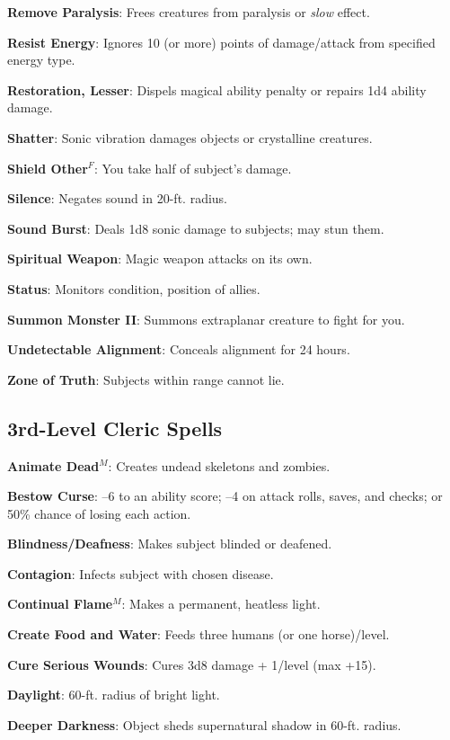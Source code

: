 \textbf{Remove Paralysis}: Frees creatures from paralysis or \textit{slow} effect.

\textbf{Resist Energy}: Ignores 10 (or more) points of damage/attack from specified energy type.

\textbf{Restoration, Lesser}: Dispels magical ability penalty or repairs 1d4 ability damage.

\textbf{Shatter}: Sonic vibration damages objects or crystalline creatures.

\textbf{Shield Other}\(^{F}\): You take half of subject's damage.

\textbf{Silence}: Negates sound in 20-ft. radius.

\textbf{Sound Burst}: Deals 1d8 sonic damage to subjects; may stun them.

\textbf{Spiritual Weapon}: Magic weapon attacks on its own.

\textbf{Status}: Monitors condition, position of allies.

\textbf{Summon Monster II}: Summons extraplanar creature to fight for you.

\textbf{Undetectable Alignment}: Conceals alignment for 24 hours.

\textbf{Zone of Truth}: Subjects within range cannot lie.

\subsection{3rd-Level Cleric Spells}


\textbf{Animate Dead}\(^{M}\): Creates undead skeletons and zombies.

\textbf{Bestow Curse}: --6 to an ability score; --4 on attack rolls, saves, and checks; or 50\% chance of losing each action.

\textbf{Blindness/Deafness}: Makes subject blinded or deafened.

\textbf{Contagion}: Infects subject with chosen disease.

\textbf{Continual Flame}\(^{M}\): Makes a permanent, heatless light.

\textbf{Create Food and Water}: Feeds three humans (or one horse)/level.

\textbf{Cure Serious Wounds}: Cures 3d8 damage + 1/level (max +15).

\textbf{Daylight}: 60-ft. radius of bright light.

\textbf{Deeper Darkness}: Object sheds supernatural shadow in 60-ft. radius.

